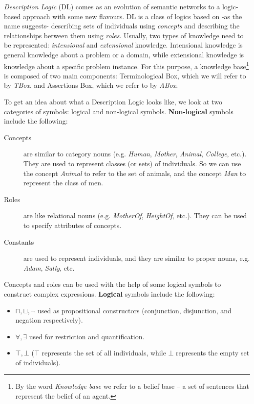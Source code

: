 \textit{Description Logic} (DL) comes as an evolution of semantic networks to a logic-based approach with some new flavours. DL is a class of logics based on -as the name suggests- describing sets of individuals using \textit{concepts} and describing the relationships between them using \textit{roles}. Usually, two types of knowledge need to be represented: \textit{intensional} and \textit{extensional} knowledge. Intensional knowledge is general knowledge about a problem or a domain, while extensional knowledge is knowledge about a specific problem instance. For this purpose, a knowledge base\footnote{By the word \textit{Knowledge base} we refer to a belief base -- a set of sentences that represent the belief of an agent.} is composed of two main components: Terminological Box, which we will refer to by \textit{TBox}, and Assertions Box, which we refer to by \textit{ABox}.

To get an idea about what a Description Logic looks like, we look at two categories of symbols: logical and non-logical symbols. \textbf{Non-logical} symbols include the following:
\begin{description}
\item[Concepts] are similar to category nouns (e.g. \textit{Human}, \textit{Mother}, \textit{Animal}, \textit{College}, etc.). They are used to represent classes (or sets) of individuals. So we can use the concept \textit{Animal} to refer to the set of animals, and the concept \textit{Man} to represent the class of men.
\item[Roles] are like relational nouns (e.g. \textit{MotherOf}, \textit{HeightOf}, etc.). They can be used to specify attributes of concepts.
\item[Constants] are used to represent individuals, and they are similar to proper nouns, e.g. \textit{Adam}, \textit{Sally}, etc.
\end{description}

Concepts and roles can be used with the help of some logical symbols to construct complex expressions. \textbf{Logical} symbols include the following:
\begin{itemize}
\item $\sqcap, \sqcup, \neg$ used as propositional constructors (conjunction, disjunction, and negation respectively).
\item $\forall, \exists$ used for restriction and quantification.
\item $\top, \bot$ ($\top$ represents the set of all individuals, while $\bot$ represents the empty set of individuals). 
\end{itemize}

